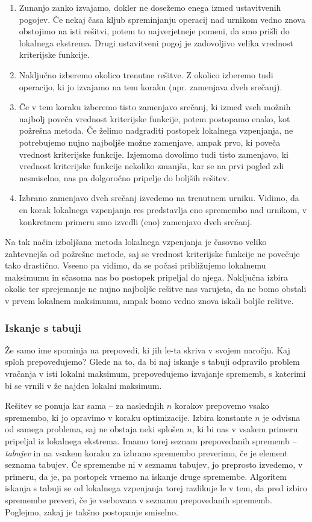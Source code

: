 \documentclass[a4paper,10pt]{article}
\begin{document}
\begin{enumerate}
    \item Zunanjo zanko izvajamo, dokler ne dosežemo enega izmed ustavitvenih pogojev. Če nekaj časa kljub spreminjanju operacij nad urnikom vedno znova obstojimo na isti rešitvi, potem to najverjetneje pomeni, da smo prišli do lokalnega ekstrema. Drugi ustavitveni pogoj je zadovoljivo velika vrednost kriterijske funkcije.
    \item Naključno izberemo okolico trenutne rešitve. Z okolico izberemo tudi operacijo, ki jo izvajamo na tem koraku (npr. zamenjava dveh srečanj).
    \item Če v tem koraku izberemo tisto zamenjavo srečanj, ki izmed vseh možnih najbolj poveča vrednost kriterijske funkcije, potem postopamo enako, kot požrešna metoda. Če želimo nadgraditi postopek lokalnega vzpenjanja, ne potrebujemo nujno najboljše možne zamenjave, ampak prvo, ki poveča vrednost kriterijske funkcije. Izjemoma dovolimo tudi tisto zamenjavo, ki vrednost kriterijske funkcije nekoliko zmanjša, kar se na prvi pogled zdi nesmiselno, nas pa dolgoročno pripelje do boljših rešitev.
    \item Izbrano zamenjavo dveh srečanj izvedemo na trenutnem urniku. Vidimo, da en korak lokalnega vzpenjanja res predstavlja eno spremembo nad urnikom, v konkretnem primeru smo izvedli (eno) zamenjavo dveh srečanj.
\end{enumerate}

Na tak način izboljšana metoda lokalnega vzpenjanja je časovno veliko zahtevnejša od požrešne metode, saj se vrednost kriterijske funkcije ne povečuje tako drastično. Vseeno pa vidimo, da se počasi približujemo lokalnemu maksimumu in sčasoma nas bo postopek pripeljal do njega. Naključna izbira okolic ter sprejemanje ne nujno najboljše rešitve nas varujeta, da ne bomo obstali v prvem lokalnem maksimumu, ampak bomo vedno znova iskali boljše rešitve.
\subsubsection{Iskanje s tabuji}
Že samo ime spominja na prepovedi, ki jih le-ta skriva v svojem naročju. Kaj sploh prepovedujemo? Glede na to, da bi naj iskanje s tabuji odpravilo problem vračanja v isti lokalni maksimum, prepovedujemo izvajanje sprememb, s katerimi bi se vrnili v že najden lokalni maksimum.

Rešitev se ponuja kar sama – za naslednjih \(n\) korakov prepovemo vsako spremembo, ki jo opravimo v koraku optimizacije. Izbira konstante \(n\) je odvisna od samega problema, saj ne obstaja neki splošen \(n\), ki bi nas v vsakem primeru pripeljal iz lokalnega ekstrema. Imamo torej seznam prepovedanih sprememb – \emph{tabujev} in na vsakem koraku za izbrano spremembo preverimo, če je element seznama tabujev. Če spremembe ni v seznamu tabujev, jo preprosto izvedemo, v primeru, da je, pa postopek vrnemo na iskanje druge spremembe. Algoritem iskanja s tabuji se od lokalnega vzpenjanja torej razlikuje le v tem, da pred izbiro spremembe preveri, če je vsebovana v seznamu prepovedanih sprememb. Poglejmo, zakaj je takšno postopanje smiselno.
\end{document}
